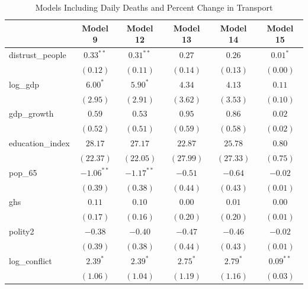 \documentclass[
  11pt,
]{article}
\begin{document}
\begin{table}
\caption{Models Including Daily Deaths and Percent Change in Transport}
\begin{center}
\begin{tabular}{l c c c c c}
\hline
 & Model 9 & Model 12 & Model 13 & Model 14 & Model 15 \\
\hline
distrust\_people          & $0.33^{**}$  & $0.31^{**}$  & $0.27$        & $0.26$        & $0.01^{*}$    \\
                          & $(0.12)$     & $(0.11)$     & $(0.14)$      & $(0.13)$      & $(0.00)$      \\
log\_gdp                  & $6.00^{*}$   & $5.90^{*}$   & $4.34$        & $4.13$        & $0.11$        \\
                          & $(2.95)$     & $(2.91)$     & $(3.62)$      & $(3.53)$      & $(0.10)$      \\
gdp\_growth               & $0.59$       & $0.53$       & $0.95$        & $0.86$        & $0.02$        \\
                          & $(0.52)$     & $(0.51)$     & $(0.59)$      & $(0.58)$      & $(0.02)$      \\
education\_index          & $28.17$      & $27.17$      & $22.87$       & $25.78$       & $0.80$        \\
                          & $(22.37)$    & $(22.05)$    & $(27.99)$     & $(27.33)$     & $(0.75)$      \\
pop\_65                   & $-1.06^{**}$ & $-1.17^{**}$ & $-0.51$       & $-0.64$       & $-0.02$       \\
                          & $(0.39)$     & $(0.38)$     & $(0.44)$      & $(0.43)$      & $(0.01)$      \\
ghs                       & $0.11$       & $0.10$       & $0.00$        & $0.01$        & $0.00$        \\
                          & $(0.17)$     & $(0.16)$     & $(0.20)$      & $(0.20)$      & $(0.01)$      \\
polity2                   & $-0.38$      & $-0.40$      & $-0.47$       & $-0.46$       & $-0.02$       \\
                          & $(0.39)$     & $(0.38)$     & $(0.44)$      & $(0.43)$      & $(0.01)$      \\
log\_conflict             & $2.39^{*}$   & $2.39^{*}$   & $2.75^{*}$    & $2.79^{*}$    & $0.09^{**}$   \\
                          & $(1.06)$     & $(1.04)$     & $(1.19)$      & $(1.16)$      & $(0.03)$      \\

\end{tabular}
\end{center}
\end{table}
\end{document}
